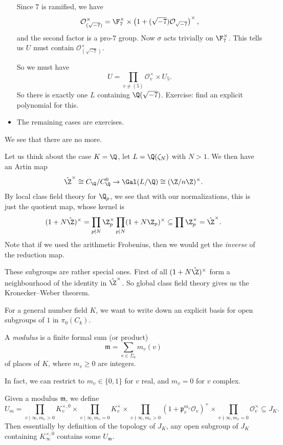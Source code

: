 \documentclass[a4paper]{article}
\begin{document}
\begin{eg}
\begin{itemize}
      Since $7$ is ramified, we have
      \[
        \mathcal{O}_{(\sqrt{-7})}^\times = \F_7^\times \times \left(1 + (\sqrt{-7}) \mathcal{O}_{\sqrt{-7}}\right)^{\times},
      \]
      and the second factor is a pro-$7$ group. Now $\sigma$ acts trivially on $\F_7^\times$. This tells us $U$ must contain $\mathcal{O}_{(\sqrt{-7})}^\times$.

      So we must have
      \[
        U = \prod_{v \not= (5)} \mathcal{O}_v^\times \times U_5.
      \]
      So there is exactly one $L$ containing $\Q(\sqrt{-7})$. Exercise: find an explicit polynomial for this.
    \item The remaining cases are exercises.
  \end{itemize}
  We see that there are no more.
\end{eg}

Let us think about the case $K = \Q$, let $L = \Q(\zeta_N)$ with $N > 1$. We then have an Artin map
\[
  \hat{\Z}^\times \cong C_\Q/C_\Q^0 \to \Gal(L/\Q) \cong (\Z/n\Z)^\times.
\]
By local class field theory for $\Q_p$, we see that with our normalizations, this is just the quotient map, whose kernel is
\[
  (1 + N \hat{\Z})^\times = \prod_{p \nmid N}\Z_p^\times \prod_{p \mid N} (1 + N \Z_p)^\times \subseteq \prod \Z_p^\times = \hat{\Z}^\times.
\]
Note that if we used the arithmetic Frobenius, then we would get the \emph{inverse} of the reduction map.

These subgroups are rather special ones. First of all $(1 + N \hat{\Z})^\times$ form a neighbourhood of the identity in $\hat{\Z}^\times$. So global class field theory gives us the Kronecker--Weber theorem.

For a general number field $K$, we want to write down an explicit basis for open subgroups of $1$ in $\pi_0(C_k)$.
\begin{defi}[Modulus]
  A \emph{modulus} is a finite formal sum (or product)
  \[
    \mathfrak{m} = \sum_{v \in \Sigma_k} m_v (v)
  \]
  of places of $K$, where $m_v \geq 0$ are integers.
\end{defi}
In fact, we can restrict to $m_v \in \{0, 1\}$ for $v$ real, and $m_v = 0$ for $v$ complex.

Given a modulus $\mathfrak{m}$, we define
\[
  U_m = \prod_{v \mid \infty, m_v > 0}\!\! K_v^{\times, 0} \times \prod_{v \mid \infty, m_v = 0} \!\!K_v^\times \times \prod_{v \nmid \infty, m_v > 0} (1 + \mathfrak{p}_v^{m_v} \mathcal{O}_v)^{\times} \times \prod_{v \nmid \infty, m_v = 0} \mathcal{O}_v^\times \subseteq J_K.
\]
Then essentially by definition of the topology of $J_K$, any open subgroup of $J_K$ containing $K_\infty^{\times, 0}$ contains some $U_\mathfrak{m}$.
\end{document}
